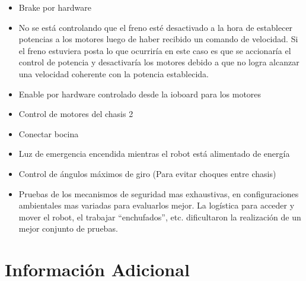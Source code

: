 \documentclass[withindex,glossary]{cam-thesis}
\begin{document}
\begin{itemize}
    \item Brake por hardware
    \item No se está controlando que el freno esté desactivado a la hora de establecer potencias a los motores luego de haber recibido un comando de velocidad. Si el freno estuviera posta lo que ocurriría en este caso es que se accionaría el control de potencia y desactivaría los motores debido a que no logra alcanzar una velocidad coherente con la potencia establecida.
    \item Enable por hardware controlado desde la ioboard para los motores
    \item Control de motores del chasis 2
    \item Conectar bocina
    \item Luz de emergencia encendida mientras el robot está alimentado de energía
    \item Control de ángulos máximos de giro (Para evitar choques entre chasis)
    \item Pruebas de los mecanismos de seguridad mas exhaustivas, en configuraciones ambientales mas variadas para evaluarlos mejor. La logística para acceder y mover el robot, el trabajar ``enchufados'', etc. dificultaron la realización de un mejor conjunto de pruebas.
\end{itemize}


\cleardoublepage
{}
{}

%




\appendix

\chapter{Información Adicional}


\printthesisindex

\listoffigures{}
\listoftables{}
\end{document}
